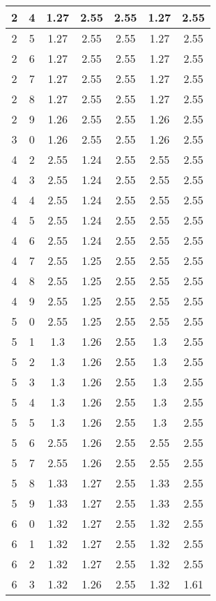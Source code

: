 \begin{longtable}{|c|c||c||c|c||c|c|}
	2 & 4 & 1.27 & 2.55 & 2.55 & 1.27 & 2.55 \\ \hline
	2 & 5 & 1.27 & 2.55 & 2.55 & 1.27 & 2.55 \\ \hline
	2 & 6 & 1.27 & 2.55 & 2.55 & 1.27 & 2.55 \\ \hline
	2 & 7 & 1.27 & 2.55 & 2.55 & 1.27 & 2.55 \\ \hline
	2 & 8 & 1.27 & 2.55 & 2.55 & 1.27 & 2.55 \\ \hline
	2 & 9 & 1.26 & 2.55 & 2.55 & 1.26 & 2.55 \\ \hline
	3 & 0 & 1.26 & 2.55 & 2.55 & 1.26 & 2.55 \\ \hline
	4 & 2 & 2.55 & 1.24 & 2.55 & 2.55 & 2.55 \\ \hline
	4 & 3 & 2.55 & 1.24 & 2.55 & 2.55 & 2.55 \\ \hline
	4 & 4 & 2.55 & 1.24 & 2.55 & 2.55 & 2.55 \\ \hline
	4 & 5 & 2.55 & 1.24 & 2.55 & 2.55 & 2.55 \\ \hline
	4 & 6 & 2.55 & 1.24 & 2.55 & 2.55 & 2.55 \\ \hline
	4 & 7 & 2.55 & 1.25 & 2.55 & 2.55 & 2.55 \\ \hline
	4 & 8 & 2.55 & 1.25 & 2.55 & 2.55 & 2.55 \\ \hline
	4 & 9 & 2.55 & 1.25 & 2.55 & 2.55 & 2.55 \\ \hline
	5 & 0 & 2.55 & 1.25 & 2.55 & 2.55 & 2.55 \\ \hline
	5 & 1 & 1.3 & 1.26 & 2.55 & 1.3 & 2.55 \\ \hline
	5 & 2 & 1.3 & 1.26 & 2.55 & 1.3 & 2.55 \\ \hline
	5 & 3 & 1.3 & 1.26 & 2.55 & 1.3 & 2.55 \\ \hline
	5 & 4 & 1.3 & 1.26 & 2.55 & 1.3 & 2.55 \\ \hline
	5 & 5 & 1.3 & 1.26 & 2.55 & 1.3 & 2.55 \\ \hline
	5 & 6 & 2.55 & 1.26 & 2.55 & 2.55 & 2.55 \\ \hline
	5 & 7 & 2.55 & 1.26 & 2.55 & 2.55 & 2.55 \\ \hline
	5 & 8 & 1.33 & 1.27 & 2.55 & 1.33 & 2.55 \\ \hline
	5 & 9 & 1.33 & 1.27 & 2.55 & 1.33 & 2.55 \\ \hline
	6 & 0 & 1.32 & 1.27 & 2.55 & 1.32 & 2.55 \\ \hline
	6 & 1 & 1.32 & 1.27 & 2.55 & 1.32 & 2.55 \\ \hline
	6 & 2 & 1.32 & 1.27 & 2.55 & 1.32 & 2.55 \\ \hline
	6 & 3 & 1.32 & 1.26 & 2.55 & 1.32 & 1.61 \\ \hline

\end{longtable}
